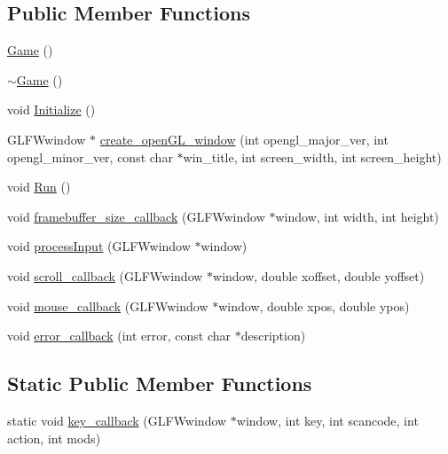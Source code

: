 \subsection*{Public Member Functions}
\begin{DoxyCompactItemize}
\item 
\hyperlink{classGame_ad59df6562a58a614fda24622d3715b65}{Game} ()
\item 
\hyperlink{classGame_ae3d112ca6e0e55150d2fdbc704474530}{$\sim$\+Game} ()
\item 
void \hyperlink{classGame_adc01a7fae5261c95f7e6b41024e6c533}{Initialize} ()
\item 
G\+L\+F\+Wwindow $\ast$ \hyperlink{classGame_ad25806b818108918a7e5fc5bd71f5de3}{create\+\_\+open\+G\+L\+\_\+window} (int opengl\+\_\+major\+\_\+ver, int opengl\+\_\+minor\+\_\+ver, const char $\ast$win\+\_\+title, int screen\+\_\+width, int screen\+\_\+height)
\item 
void \hyperlink{classGame_a96341ca5b54d90adc3ecb3bf0bcd2312}{Run} ()
\item 
void \hyperlink{classGame_add1087a248a7e136debe003af25f9fa2}{framebuffer\+\_\+size\+\_\+callback} (G\+L\+F\+Wwindow $\ast$window, int width, int height)
\item 
void \hyperlink{classGame_a600b6bf8efd1874f5b5bdb8fdc48e549}{process\+Input} (G\+L\+F\+Wwindow $\ast$window)
\item 
void \hyperlink{classGame_ac3931568d19483386124d89aa0e2a762}{scroll\+\_\+callback} (G\+L\+F\+Wwindow $\ast$window, double xoffset, double yoffset)
\item 
void \hyperlink{classGame_ade7c4fb6814172307baa622f1b4bb566}{mouse\+\_\+callback} (G\+L\+F\+Wwindow $\ast$window, double xpos, double ypos)
\item 
void \hyperlink{classGame_a78d191af16100cc28477474bc0b1e2de}{error\+\_\+callback} (int error, const char $\ast$description)
\end{DoxyCompactItemize}
\subsection*{Static Public Member Functions}
\begin{DoxyCompactItemize}
\item 
static void \hyperlink{classGame_a1622ae34c02e33376dabde5294c9a8e8}{key\+\_\+callback} (G\+L\+F\+Wwindow $\ast$window, int key, int scancode, int action, int mods)
\end{DoxyCompactItemize}
